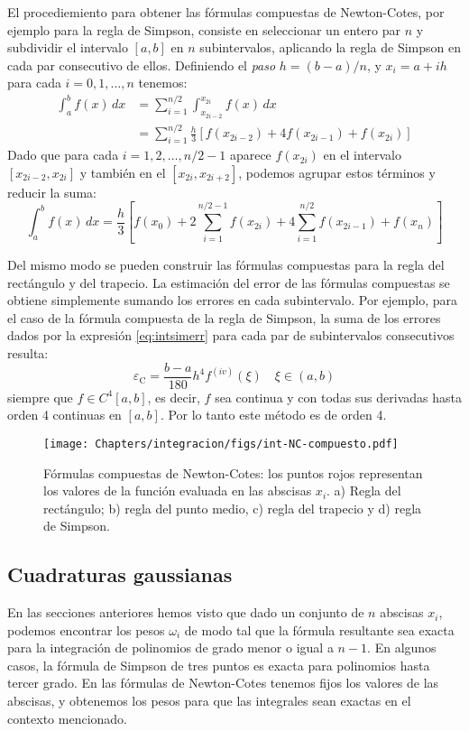 El procediemiento para obtener las fórmulas compuestas de Newton-Cotes, por ejemplo para la regla de Simpson, consiste en seleccionar un entero par $n$ y subdividir el intervalo $[a, b]$ en $n$ subintervalos, aplicando la regla de Simpson en cada par consecutivo de ellos. Definiendo el \textit{paso} $h = (b -a)/n$, y $x_i = a + i h$ para cada $i = 0, 1, \ldots, n$ tenemos:
\begin{align*}
 \int_a^b f(x) \, dx &= \sum_{i=1}^{n/2} \int_{x_{2i-2}}^{x_{2i}} f(x) \, dx \\
  &= \sum_{i=1}^{n/2}  \frac{h}{3} \left[ f(x_{2i-2}) + 4 f(x_{2i-1}) + f(x_{2i}) \right] 
\end{align*} 
Dado que para cada $i = 1, 2, \ldots, n/2 - 1$ aparece $f(x_{2i})$ en el intervalo $[x_{2i-2}, x_{2i}]$ y también en el $[x_{2i}, x_{2i+2}]$, podemos agrupar estos términos y reducir la suma:
\begin{equation}
 \int_a^b f(x) \, dx = \frac{h}{3} \left[ f(x_0) + 2 \sum_{i=1}^{n/2-1} f(x_{2i}) + 4 \sum_{i=1}^{n/2} f(x_{2i-1}) + f(x_n) \right]
\end{equation} 

Del mismo modo se pueden construir las fórmulas compuestas para la regla del rectángulo y del trapecio. La estimación del error de las fórmulas compuestas se obtiene simplemente sumando los errores en cada subintervalo. Por ejemplo, para el caso de la fórmula compuesta de la regla de Simpson, la suma de los errores dados por la expresión  \eqref{eq:intsimerr} para cada par de subintervalos consecutivos resulta:
\[ \varepsilon_{\text{C}} = \frac{b-a}{180} h^4 f^{(iv)}(\xi) \quad \xi \in (a,b) \]
siempre que $f \in C^4[a,b]$, es decir, $f$ sea continua y con todas sus derivadas hasta orden 4 continuas en $[a, b]$. Por lo tanto este método es de orden 4.

\begin{figure}[t]
 \centering
 \texttt{[image: Chapters/integracion/figs/int-NC-compuesto.pdf]}
 \caption{Fórmulas compuestas de Newton-Cotes: los puntos rojos representan los valores de la función evaluada en las abscisas $x_i$. a) Regla del rectángulo; b) regla del punto medio, c) regla del trapecio y d) regla de Simpson.}
 \label{fig:int02}
\end{figure}



\subsection{Cuadraturas gaussianas}
En las secciones anteriores hemos visto que dado un conjunto de $n$ abscisas $x_i$, podemos encontrar los pesos $\omega_i$ de modo tal que la fórmula resultante sea exacta para la integración de polinomios de grado menor o igual a $n-1$. En algunos casos, la fórmula de Simpson de tres puntos es exacta para polinomios hasta tercer grado. En las fórmulas de Newton-Cotes tenemos fijos los valores de las abscisas, y obtenemos los pesos para que las integrales sean exactas en el contexto mencionado.

